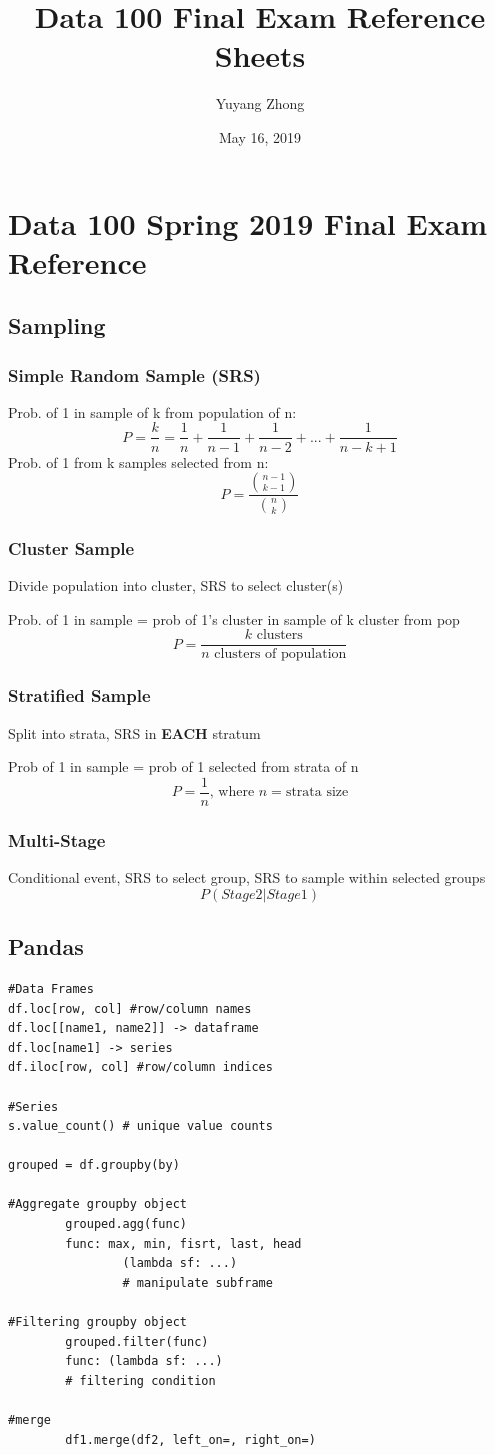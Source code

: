 \documentclass[8pt]{extarticle}
\title{Data 100 Final Exam Reference Sheets}
\author{Yuyang Zhong}
\date{May 16, 2019}
\begin{document}
\section*{Data 100 Spring 2019 Final Exam Reference}

\subsection*{Sampling}
\subsubsection*{Simple Random Sample (SRS)}
Prob. of 1 in sample of k from population of n:
$$ P = \frac{k}{n} = \frac{1}{n} + \frac{1}{n-1} + \frac{1}{n-2} + ... + \frac{1}{n-k+1}  $$
Prob. of 1 from k samples selected from n:
$$ P= \frac{{n-1\choose k-1}}{{n\choose k}} $$

\subsubsection*{Cluster Sample}
Divide population into cluster, SRS to select cluster(s)

Prob. of 1 in sample = prob of 1's cluster in sample of k cluster from pop
$$ P =\frac{k\mbox{ clusters}}{n\mbox{ clusters of population}} $$


\subsubsection*{Stratified Sample}
Split into strata, SRS in \textbf{EACH} stratum

Prob of 1 in sample = prob of 1 selected from strata of n 
$$ P = \frac{1}{n} \mbox{, where } n = \mbox{strata size} $$

\subsubsection*{Multi-Stage}
Conditional event, SRS to select group, SRS to sample within selected groups
$$ P(Stage 2 | Stage 1) $$
\hline

\subsection*{Pandas}
\begin{verbatim}
#Data Frames
df.loc[row, col] #row/column names
df.loc[[name1, name2]] -> dataframe
df.loc[name1] -> series
df.iloc[row, col] #row/column indices

#Series
s.value_count() # unique value counts

grouped = df.groupby(by)
        
#Aggregate groupby object
        grouped.agg(func)
        func: max, min, fisrt, last, head
                (lambda sf: ...) 
                # manipulate subframe
                
#Filtering groupby object
        grouped.filter(func)
        func: (lambda sf: ...) 
        # filtering condition

#merge
        df1.merge(df2, left_on=, right_on=)
\end{verbatim}
\hline
\end{document}
